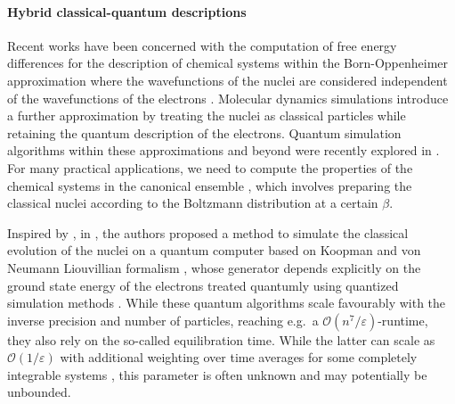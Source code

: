 \documentclass[11pt]{amsart}
\newcommand{\1}{\mathbbm{1}}
\theoremstyle{plain}
\theoremstyle{definition}
\theoremstyle{remark}
\numberwithin{equation}{section}
\begin{document}
\paragraph{\textbf{Hybrid classical-quantum descriptions}}
Recent works have been concerned with the computation of free energy differences for the description of chemical systems within the Born-Oppenheimer approximation where the wavefunctions of the nuclei 
are considered independent of the wavefunctions of the electrons \cite{xu2023slow,ries2022relative,santagati2024drug}. Molecular dynamics simulations introduce a further approximation by treating the nuclei as classical particles while retaining the quantum description of the electrons. Quantum simulation algorithms within these approximations and beyond were recently explored in \cite{kassal2011simulating,ollitrault2020nonadiabatic,fedorov2021ab,sokolov2021microcanonical,o2019calculating,o2022efficient,steudtner2023fault}. For many practical applications, we need to compute the
properties of the chemical systems in the canonical ensemble \cite{xu2023slow,santagati2024drug,tuckerman2000understanding,manathunga2022computer}, which involves preparing the classical  nuclei according to the Boltzmann distribution at a certain $\beta$. 

Inspired by  \cite{joseph2020koopman,jin2023time},
in \cite{simon2024improved,huang2025fullqubit,GuntherEtAl2025}, the authors proposed a method to simulate the classical evolution of the nuclei on a quantum computer based on Koopman and von Neumann 
Liouvillian formalism \cite{koopman1931hamiltonian}, whose generator depends explicitly on the ground state energy of the electrons treated quantumly using quantized simulation methods  \cite{babbush2019quantum,su2021fault}.
While these quantum algorithms scale favourably with the inverse precision and number of particles, reaching e.g.~a $\mathcal{O}(n^7/\varepsilon)$-runtime, they also rely on the so-called equilibration time. While the latter can scale as $\mathcal{O}(1/\varepsilon)$ with additional weighting over time averages for some completely integrable systems \cite{cances2005long}, this parameter is often unknown and may potentially be unbounded.
\end{document}
